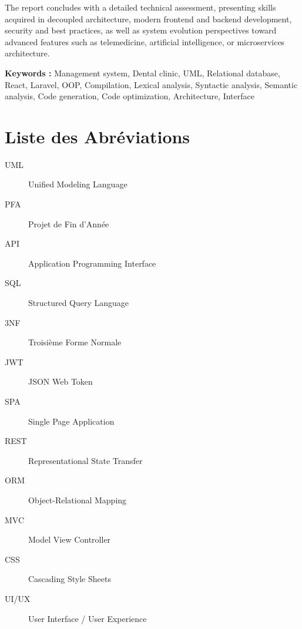 \documentclass[12pt,a4paper]{report}
\begin{document}
The report concludes with a detailed technical assessment, presenting skills acquired in decoupled architecture, modern frontend and backend development, security and best practices, as well as system evolution perspectives toward advanced features such as telemedicine, artificial intelligence, or microservices architecture.

\vspace{0.5cm}
\textbf{Keywords :} Management system, Dental clinic, UML, Relational database, React, Laravel, OOP, Compilation, Lexical analysis, Syntactic analysis, Semantic analysis, Code generation, Code optimization, Architecture, Interface

\newpage

\tableofcontents
\newpage

\chapter*{Liste des Abréviations}
\thispagestyle{empty}

\begin{description}
\item[UML] Unified Modeling Language
\item[PFA] Projet de Fin d'Année
\item[API] Application Programming Interface
\item[SQL] Structured Query Language
\item[3NF] Troisième Forme Normale
\item[JWT] JSON Web Token
\item[SPA] Single Page Application
\item[REST] Representational State Transfer
\item[ORM] Object-Relational Mapping
\item[MVC] Model View Controller
\item[CSS] Cascading Style Sheets
\item[UI/UX] User Interface / User Experience
\end{description}

\newpage

\listoffigures
\newpage

\listoftables
\newpage


\setcounter{page}{1}
\end{document}
